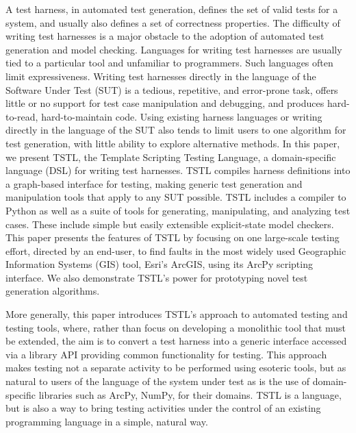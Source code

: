 A test harness, in automated test generation, defines the set of valid tests
for a system, and usually also defines a set of correctness
properties.  The difficulty of writing test harnesses is a major
obstacle to the adoption of automated test generation and model
checking.  Languages for writing test harnesses are usually tied to a
particular tool and unfamiliar to programmers.  Such languages often limit
expressiveness.  Writing test harnesses directly in the language of
the Software Under Test (SUT) is a tedious, repetitive, and
error-prone task, offers little or no support for test case
manipulation and debugging, and produces hard-to-read, hard-to-maintain
code.  Using existing harness languages or writing directly in the
language of the SUT also tends to limit users to one algorithm for
test generation, with little ability to explore alternative methods.
In this paper, we present TSTL, the Template Scripting Testing
Language, a domain-specific language (DSL) for writing test harnesses.
TSTL compiles harness definitions into a graph-based
interface for testing, making generic
test generation and manipulation tools that apply to any SUT possible.  TSTL includes a
compiler to Python as well as a suite of tools for generating, manipulating,
and analyzing test cases.  These include simple but easily extensible explicit-state model
checkers.  This paper presents the features of TSTL by focusing on
one large-scale testing effort, directed by an end-user, to find
faults in the most widely used Geographic Information Systems (GIS) tool,
Esri's ArcGIS, using its ArcPy scripting interface.  We also
demonstrate TSTL's power for prototyping novel test generation
algorithms.  

More generally, this paper introduces TSTL's approach to automated
testing and testing tools, where, rather than focus on developing a
monolithic tool that must be extended, the aim is to convert a test
harness into a generic interface accessed via a library API providing
common functionality for testing.  This approach makes testing not a
separate activity to be performed using esoteric tools, but as natural
to users of the language of the system under test as is the use of
domain-specific libraries such as ArcPy, NumPy, for their domains.
TSTL is a language, but is also a way to bring testing activities
under the control of an existing programming language in a simple,
natural way.



